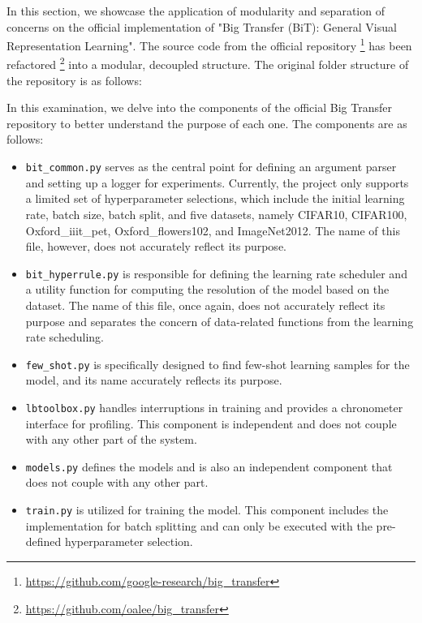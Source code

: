 \documentclass{article}
\begin{document}
In this section, we showcase the application of modularity and separation of concerns on the official implementation of "Big Transfer (BiT): General Visual Representation Learning"\cite{transferlearning}. The source code from the official repository \footnote{\url{https://github.com/google-research/big_transfer}} has been refactored \footnote{\url{https://github.com/oalee/big_transfer}} into a modular, decoupled structure.  The original folder structure of the repository is as follows:

\vspace{0.4em}
In this examination, we delve into the components of the official Big Transfer repository to better understand the purpose of each one. The components are as follows:

\begin{itemize}
    \item \texttt{bit\_common.py} serves as the central point for defining an argument parser and setting up a logger for experiments. Currently, the project only supports a limited set of hyperparameter selections, which include the initial learning rate, batch size, batch split, and five datasets, namely CIFAR10, CIFAR100, Oxford\_iiit\_pet, Oxford\_flowers102, and ImageNet2012. The name of this file, however, does not accurately reflect its purpose.
    \item \texttt{bit\_hyperrule.py} is responsible for defining the learning rate scheduler and a utility function for computing the resolution of the model based on the dataset. The name of this file, once again, does not accurately reflect its purpose and separates the concern of data-related functions from the learning rate scheduling.
    \item \texttt{few\_shot.py} is specifically designed to find few-shot learning samples for the model, and its name accurately reflects its purpose.
    \item \texttt{lbtoolbox.py} handles interruptions in training and provides a chronometer interface for profiling. This component is independent and does not couple with any other part of the system.
    \item \texttt{models.py} defines the models and is also an independent component that does not couple with any other part.
    \item \texttt{train.py} is utilized for training the model. This component includes the implementation for batch splitting and can only be executed with the pre-defined hyperparameter selection.
\end{itemize}
\end{document}

